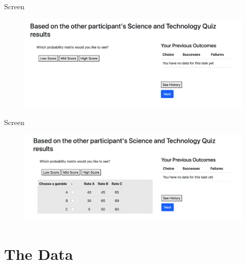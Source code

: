 \documentclass[aspectratio=169]{beamer}
\begin{document}
\begin{frame}{Screen}
    \begin{figure}
        \centering
        \includegraphics[scale=.4]{screen1.png}
    \end{figure}
\end{frame}

\begin{frame}{Screen}
    \begin{figure}
        \centering
        \includegraphics[scale=.4]{screen2.png}
    \end{figure}
\end{frame}

\section*{The Data}
\end{document}
